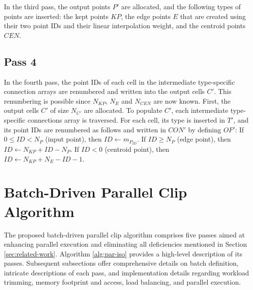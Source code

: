 \documentclass{egpubl}
\begin{document}
In the third pass, the output points $P'$ are allocated, and the following types of points are inserted: the kept points $KP$, the edge points $E$ that are created using their two point IDs and their linear interpolation weight, and the centroid points $CEN$.

\subsection{Pass 4}

In the fourth pass, the point IDs of each cell in the intermediate type-specific connection arrays are renumbered and written into the output cells $C'$. This renumbering is possible since $N_{KP}$, $N_E$ and $N_{CEN}$ are now known. First, the output cells $C'$ of size $N_{C'}$ are allocated. To populate $C'$, each intermediate type-specific connections array is traversed. For each cell, its type is inserted in $T'$, and its point IDs are renumbered as follows and written in $CON'$ by defining $OF'$:
If $0 \leq ID < N_P$ (input point), then $ID \gets m_{P_{ID}}$.
If $ID \geq N_P$ (edge point), then $ID \gets N_{KP} + ID - N_P$.
If $\textit{ID} < 0 $ (centroid point), then $ID \gets N_{KP} + N_E - ID - 1$.

\section{Batch-Driven Parallel Clip Algorithm}
\label{sec:batch-driven-parallel-clip-algorithm}

The proposed batch-driven parallel clip algorithm comprises five passes aimed at enhancing parallel execution and eliminating all deficiencies mentioned in Section \ref{sec:related-work}. Algorithm \ref{alg:par-iso} provides a high-level description of its passes. Subsequent subsections offer comprehensive details on batch definition, intricate descriptions of each pass, and implementation details regarding workload trimming, memory footprint and access, load balancing, and parallel execution.
\end{document}

